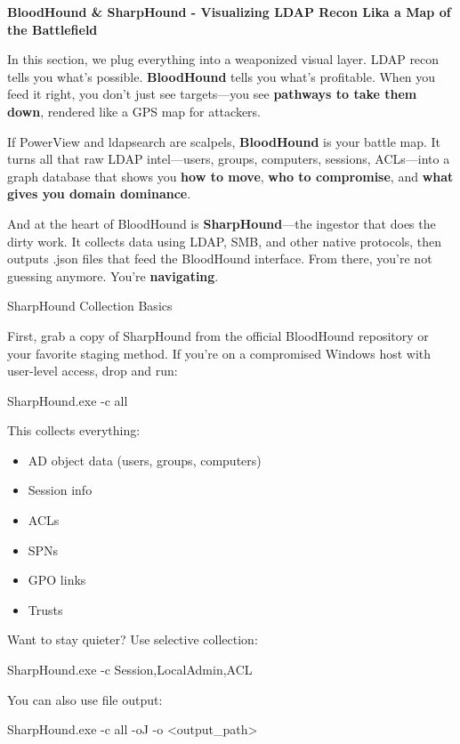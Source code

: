 \textbf{BloodHound \& SharpHound - Visualizing LDAP Recon Lika a Map of the Battlefield}

In this section, we plug everything into a weaponized visual layer. LDAP recon tells you what’s possible. \textbf{BloodHound} tells you what’s profitable. When you feed it right, you don’t just see targets—you see \textbf{pathways to take them down}, rendered like a GPS map for attackers.

If PowerView and ldapsearch are scalpels, \textbf{BloodHound} is your battle map. It turns all that raw LDAP intel—users, groups, computers, sessions, ACLs—into a graph database that shows you \textbf{how to move}, \textbf{who to compromise}, and \textbf{what gives you domain dominance}.

And at the heart of BloodHound is \textbf{SharpHound}—the ingestor that does the dirty work. It collects data using LDAP, SMB, and other native protocols, then outputs .json files that feed the BloodHound interface. From there, you’re not guessing anymore. You’re \textbf{navigating}.

SharpHound Collection Basics

First, grab a copy of SharpHound from the official BloodHound repository or your favorite staging method. If you’re on a compromised Windows host with user-level access, drop and run:

SharpHound.exe -c all

This collects everything:

\begin{itemize}
    \item AD object data (users, groups, computers)

    \item Session info

    \item ACLs

    \item SPNs

    \item GPO links

    \item Trusts

\end{itemize}
Want to stay quieter? Use selective collection:

SharpHound.exe -c Session,LocalAdmin,ACL

You can also use file output:

SharpHound.exe -c all -oJ -o <output\_path>

